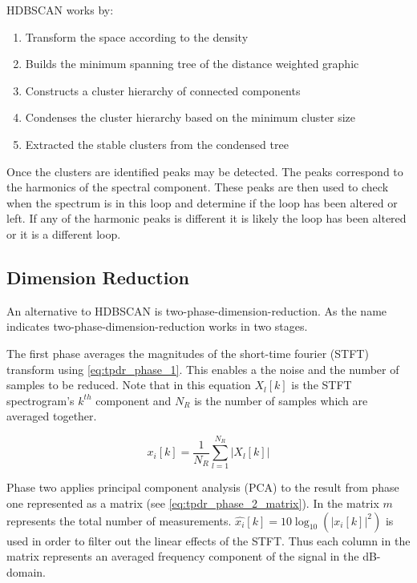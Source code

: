       HDBSCAN works by:
      \begin{enumerate}
        \item Transform the space according to the density
        \item Builds the minimum spanning tree of the distance weighted graphic
        \item Constructs a cluster hierarchy of connected components
        \item Condenses the cluster hierarchy based on the minimum cluster size
        \item Extracted the stable clusters from the condensed tree
      \end{enumerate}

      Once the clusters are identified peaks may be detected.
      The peaks correspond to the harmonics of the spectral component.
      These peaks are then used to check when the spectrum is in this loop and determine if the loop has been altered or left.
      If any of the harmonic peaks is different it is likely the loop has been altered or it is a different loop.

    \subsection{Dimension Reduction}

      An alternative to HDBSCAN is two-phase-dimension-reduction.
      As the name indicates two-phase-dimension-reduction works in two stages. 

      The first phase averages the magnitudes of the short-time fourier (STFT) transform using \autoref{eq:tpdr_phase_1}.
      This enables a the noise and the number of samples to be reduced.
      Note that in this equation $X_l[k]$ is the STFT spectrogram's $k^{th}$ component and $N_R$ is the number of samples which are averaged together.

      \begin{equation}
        \label{eq:tpdr_phase_1}
        x_i[k] = \frac{1}{N_R} \sum_{l = 1}^{N_R} \vert X_l[k] \vert
      \end{equation}

      Phase two applies principal component analysis (PCA) to the result from phase one represented as a matrix (see \autoref{eq:tpdr_phase_2_matrix}).
      In the matrix $m$ represents the total number of measurements.
      $\hat{x_i}[k] = 10 \log_{10}(|x_i[k]|^2)$ is used in order to filter out the linear effects of the STFT.
      Thus each column in the matrix represents an averaged frequency component of the signal in the dB-domain.

